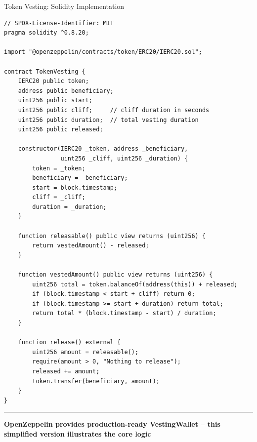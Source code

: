 \documentclass[8pt,aspectratio=169]{beamer}
\newcommand{\bottomnote}[1]{\vfill\vspace{-2mm}\textcolor{mllavender2}{\rule{\textwidth}{0.4pt}}\vspace{1mm}\footnotesize\textbf{#1}}
\begin{document}
\begin{frame}[fragile]{Token Vesting: Solidity Implementation}
\begin{lstlisting}
// SPDX-License-Identifier: MIT
pragma solidity ^0.8.20;

import "@openzeppelin/contracts/token/ERC20/IERC20.sol";

contract TokenVesting {
    IERC20 public token;
    address public beneficiary;
    uint256 public start;
    uint256 public cliff;     // cliff duration in seconds
    uint256 public duration;  // total vesting duration
    uint256 public released;

    constructor(IERC20 _token, address _beneficiary,
                uint256 _cliff, uint256 _duration) {
        token = _token;
        beneficiary = _beneficiary;
        start = block.timestamp;
        cliff = _cliff;
        duration = _duration;
    }

    function releasable() public view returns (uint256) {
        return vestedAmount() - released;
    }

    function vestedAmount() public view returns (uint256) {
        uint256 total = token.balanceOf(address(this)) + released;
        if (block.timestamp < start + cliff) return 0;
        if (block.timestamp >= start + duration) return total;
        return total * (block.timestamp - start) / duration;
    }

    function release() external {
        uint256 amount = releasable();
        require(amount > 0, "Nothing to release");
        released += amount;
        token.transfer(beneficiary, amount);
    }
}
\end{lstlisting}
\bottomnote{OpenZeppelin provides production-ready VestingWallet -- this simplified version illustrates the core logic}
\end{frame}
\end{document}
